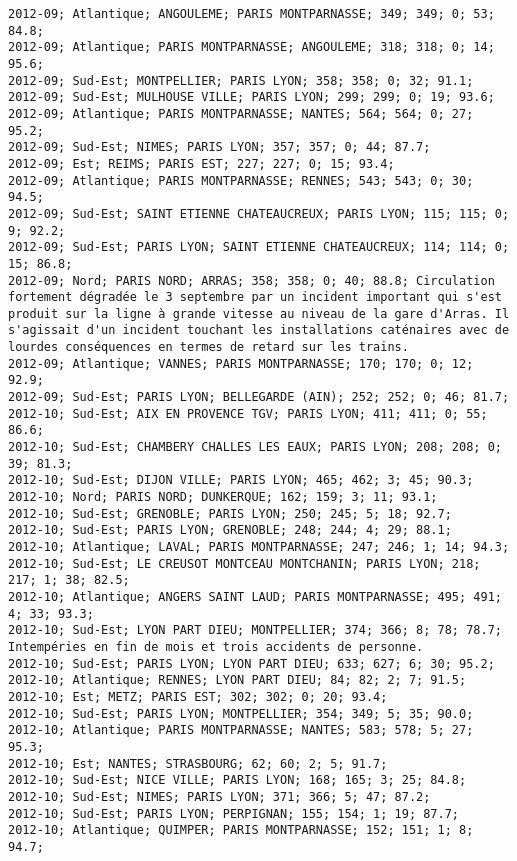 \documentclass{article}
\begin{document}
\begin{Verbatim}[commandchars=\\\{\}]
2012-09; Atlantique; ANGOULEME; PARIS MONTPARNASSE; 349; 349; 0; 53; 84.8; 
2012-09; Atlantique; PARIS MONTPARNASSE; ANGOULEME; 318; 318; 0; 14; 95.6; 
2012-09; Sud-Est; MONTPELLIER; PARIS LYON; 358; 358; 0; 32; 91.1; 
2012-09; Sud-Est; MULHOUSE VILLE; PARIS LYON; 299; 299; 0; 19; 93.6; 
2012-09; Atlantique; PARIS MONTPARNASSE; NANTES; 564; 564; 0; 27; 95.2; 
2012-09; Sud-Est; NIMES; PARIS LYON; 357; 357; 0; 44; 87.7; 
2012-09; Est; REIMS; PARIS EST; 227; 227; 0; 15; 93.4; 
2012-09; Atlantique; PARIS MONTPARNASSE; RENNES; 543; 543; 0; 30; 94.5; 
2012-09; Sud-Est; SAINT ETIENNE CHATEAUCREUX; PARIS LYON; 115; 115; 0; 9; 92.2; 
2012-09; Sud-Est; PARIS LYON; SAINT ETIENNE CHATEAUCREUX; 114; 114; 0; 15; 86.8; 
2012-09; Nord; PARIS NORD; ARRAS; 358; 358; 0; 40; 88.8; Circulation fortement dégradée le 3 septembre par un incident important qui s'est produit sur la ligne à grande vitesse au niveau de la gare d'Arras. Il s'agissait d'un incident touchant les installations caténaires avec de lourdes conséquences en termes de retard sur les trains.
2012-09; Atlantique; VANNES; PARIS MONTPARNASSE; 170; 170; 0; 12; 92.9; 
2012-09; Sud-Est; PARIS LYON; BELLEGARDE (AIN); 252; 252; 0; 46; 81.7; 
2012-10; Sud-Est; AIX EN PROVENCE TGV; PARIS LYON; 411; 411; 0; 55; 86.6; 
2012-10; Sud-Est; CHAMBERY CHALLES LES EAUX; PARIS LYON; 208; 208; 0; 39; 81.3; 
2012-10; Sud-Est; DIJON VILLE; PARIS LYON; 465; 462; 3; 45; 90.3; 
2012-10; Nord; PARIS NORD; DUNKERQUE; 162; 159; 3; 11; 93.1; 
2012-10; Sud-Est; GRENOBLE; PARIS LYON; 250; 245; 5; 18; 92.7; 
2012-10; Sud-Est; PARIS LYON; GRENOBLE; 248; 244; 4; 29; 88.1; 
2012-10; Atlantique; LAVAL; PARIS MONTPARNASSE; 247; 246; 1; 14; 94.3; 
2012-10; Sud-Est; LE CREUSOT MONTCEAU MONTCHANIN; PARIS LYON; 218; 217; 1; 38; 82.5; 
2012-10; Atlantique; ANGERS SAINT LAUD; PARIS MONTPARNASSE; 495; 491; 4; 33; 93.3; 
2012-10; Sud-Est; LYON PART DIEU; MONTPELLIER; 374; 366; 8; 78; 78.7; Intempéries en fin de mois et trois accidents de personne.
2012-10; Sud-Est; PARIS LYON; LYON PART DIEU; 633; 627; 6; 30; 95.2; 
2012-10; Atlantique; RENNES; LYON PART DIEU; 84; 82; 2; 7; 91.5; 
2012-10; Est; METZ; PARIS EST; 302; 302; 0; 20; 93.4; 
2012-10; Sud-Est; PARIS LYON; MONTPELLIER; 354; 349; 5; 35; 90.0; 
2012-10; Atlantique; PARIS MONTPARNASSE; NANTES; 583; 578; 5; 27; 95.3; 
2012-10; Est; NANTES; STRASBOURG; 62; 60; 2; 5; 91.7; 
2012-10; Sud-Est; NICE VILLE; PARIS LYON; 168; 165; 3; 25; 84.8; 
2012-10; Sud-Est; NIMES; PARIS LYON; 371; 366; 5; 47; 87.2; 
2012-10; Sud-Est; PARIS LYON; PERPIGNAN; 155; 154; 1; 19; 87.7; 
2012-10; Atlantique; QUIMPER; PARIS MONTPARNASSE; 152; 151; 1; 8; 94.7; 

\end{Verbatim}
\end{document}
